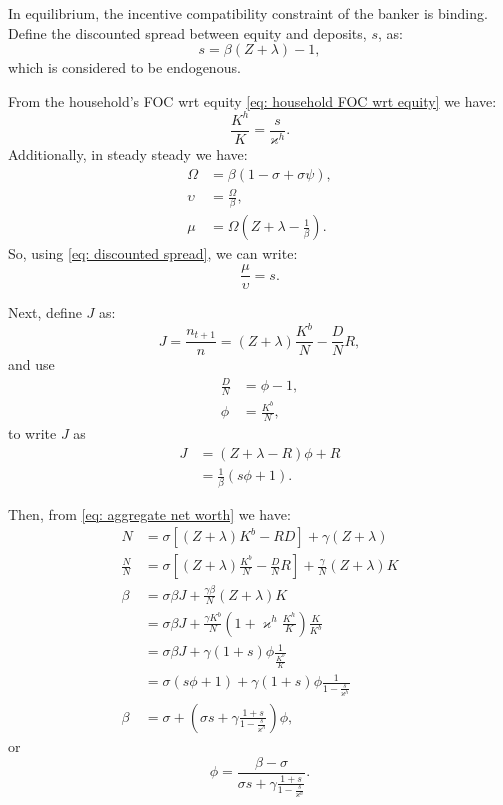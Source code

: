 \documentclass[12pt,english]{extarticle}
\begin{document}
	In equilibrium, the incentive compatibility constraint of the banker is binding. Define the discounted spread between equity and deposits, $s$, as:
	\begin{equation}
		\label{eq: discounted spread}
		s = \beta(Z + \lambda) - 1,
	\end{equation}
	which is considered to be endogenous.
	
	From the household's FOC wrt equity \eqref{eq: household FOC wrt equity} we have:
	\begin{equation*}
		\frac{K^h}{K} = \frac{s}{\varkappa^h}.
	\end{equation*}
	Additionally, in steady steady we have:
	\begin{align*}
		\Omega &= \beta(1-\sigma+\sigma\psi), \\
		\upsilon &= \frac{\Omega}{\beta}, \\
		\mu &= \Omega\left(Z + \lambda - \frac{1}{\beta}\right).
	\end{align*}
	So, using \eqref{eq: discounted spread}, we can write:
	\begin{equation*}
		\frac{\mu}{\upsilon} = s.
	\end{equation*}
	
	Next, define $J$ as:
	\begin{equation*}
		J = \frac{n_{t+1}}{n} = (Z + \lambda)\frac{K^b}{N} - \frac{D}{N}R,
	\end{equation*}
	and use
	\begin{align*}
		\frac{D}{N} &= \phi - 1, \\
		\phi &= \frac{K^b}{N},
	\end{align*}
	to write $J$ as
	\begin{equation*}
		\begin{split}
			J &= \left(Z + \lambda - R\right)\phi + R \\
			&= \frac{1}{\beta}\left(s\phi + 1\right).
		\end{split}
	\end{equation*}
	
	Then, from \eqref{eq: aggregate net worth} we have:
	\begin{align*}
		N &= \sigma\left[(Z + \lambda)K^b - RD\right] + \gamma\left(Z+\lambda\right) \\
		\frac{N}{N}	&= \sigma\left[(Z+\lambda)\frac{K^b}{N} - \frac{D}{N}R\right] + \frac{\gamma}{N}(Z + \lambda)K \\
		\beta &= \sigma\beta J + \frac{\gamma\beta}{N}(Z + \lambda)K \\
		& = \sigma\beta J + \frac{\gamma K^b}{N}\left(1 + \varkappa^h\frac{K^h}{K}\right)\frac{K}{K^b} \\
		&= \sigma\beta J + \gamma(1+s)\phi\frac{1}{\frac{K^b}{K}} \\
		&= \sigma\left(s\phi + 1\right) + \gamma(1+s)\phi\frac{1}{1-\frac{s}{\varkappa^h}} \\
		\beta &= \sigma + \left(\sigma s + \gamma\frac{1+s}{1-\frac{s}{\varkappa^h}}\right)\phi,
	\end{align*}
	or
	\begin{equation*}
		\phi = \frac{\beta - \sigma}{\sigma s + \gamma \frac{1+s}{1-\frac{s}{\varkappa^h}}}.
	\end{equation*}
	
\end{document}
